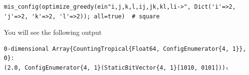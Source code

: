 \documentclass{article}
\newcommand{\<}{\langle}
\renewcommand{\>}{\rangle}
\theoremstyle{definition}\newtheorem{definition}{\textit{Definition}}
\begin{document}
\begin{lstlisting}
mis_config(optimize_greedy(ein"i,j,k,l,ij,jk,kl,li->", Dict('i'=>2, 'j'=>2, 'k'=>2, 'l'=>2)); all=true)  # square
\end{lstlisting}

You will see the following output

\begin{lstlisting}
0-dimensional Array{CountingTropical{Float64, ConfigEnumerator{4, 1}}, 0}:
(2.0, ConfigEnumerator{4, 1}(StaticBitVector{4, 1}[1010, 0101]))ₜ
\end{lstlisting}
\end{document}
